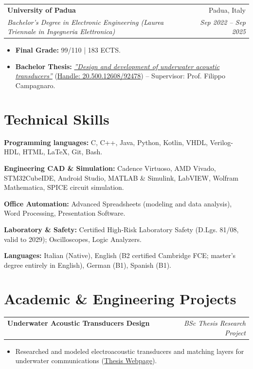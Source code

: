\documentclass[10pt,a4paper]{article}
\makeatletter
\newcommand{\resumeItem}[1]{%
  \item\small{#1}%
}
\newcommand{\resumeSubheading}[4]{%
  \vspace{0.5pt}
  \noindent\begin{tabular*}{\textwidth}[t]{@{}l@{\extracolsep{\fill}}r@{}}
    \textbf{#1} & \textcolor{secondary}{\small #2} \\
    \textit{\small #3} & \textcolor{secondary}{\textit{\small #4}} \\
  \end{tabular*}\vspace{-2pt}
}
\newcommand{\resumeProjectHeading}[2]{%
  \vspace{0.5pt}
  \noindent\begin{tabular*}{\textwidth}[t]{@{}l@{\extracolsep{\fill}}r@{}}
    \textbf{#1} & \textcolor{secondary}{\textit{\small #2}} \\
  \end{tabular*}\vspace{-2pt}
}
\newcommand{\resumeItemListStart}{\begin{itemize}[leftmargin=1.15em, itemsep=2.2pt, topsep=0.5pt, parsep=0pt]}
\newcommand{\resumeItemListEnd}{\end{itemize}\vspace{0pt}}
\makeatother
\begin{document}
\resumeSubheading
  {University of Padua}{Padua, Italy}
  {Bachelor's Degree in Electronic Engineering (Laurea Triennale in Ingegneria Elettronica)}{Sep 2022 -- Sep 2025}
  \resumeItemListStart
    \resumeItem{\textbf{Final Grade:} 99/110 | 183 ECTS.}
    \resumeItem{\textbf{Bachelor Thesis:} \href{https://hdl.handle.net/20.500.12608/92478}{\textit{''Design and development of underwater acoustic transducers''}} (\href{https://hdl.handle.net/20.500.12608/92478}{Handle: 20.500.12608/92478}) -- Supervisor: Prof. Filippo Campagnaro.}
  \resumeItemListEnd

\section{Technical Skills}
\begin{itemize}[leftmargin=1.15em, itemsep=2.2pt, topsep=1.5pt, parsep=0pt]
    \small{
    \item{\textbf{Programming languages:} C, C++, Java, Python, Kotlin, VHDL, Verilog-HDL, HTML, LaTeX, Git, Bash.}
    \item{\textbf{Engineering CAD \& Simulation:} Cadence Virtuoso, AMD Vivado, STM32CubeIDE, Android Studio, MATLAB \& Simulink, LabVIEW, Wolfram Mathematica, SPICE circuit simulation.}
    \item{\textbf{Office Automation:} Advanced Spreadsheets (modeling and data analysis), Word Processing, Presentation Software.}
    \item{\textbf{Laboratory \& Safety:} Certified High-Risk Laboratory Safety (D.Lgs. 81/08, valid to 2029); Oscilloscopes, Logic Analyzers.}
    \item{\textbf{Languages:} Italian (Native), English (B2 certified Cambridge FCE; master's degree entirely in English), German (B1), Spanish (B1).}
    }
\end{itemize}

\section{Academic \& Engineering Projects}

\resumeProjectHeading
  {\textbf{Underwater Acoustic Transducers Design} \ \textbar\ \ \normalfont{\textit{Electroacoustics, Simulation}}}{BSc Thesis Research Project}
  \resumeItemListStart
    \resumeItem{Researched and modeled electroacoustic transducers and matching layers for underwater communications (\href{https://hdl.handle.net/20.500.12608/92478}{Thesis Webpage}).}
  \resumeItemListEnd
\end{document}
